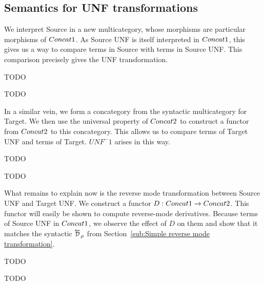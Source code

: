 \subsection{Semantics for UNF transformations} %
\label{sub:Semantics for UNF transformations}

We interpret Source in a new multicategory, 
whose morphisms are particular morphisms of $Concat1$.
As Source UNF is itself interpreted in $Concat1$, 
this gives us a way to compare terms in Source with terms in Source UNF.
This comparison precisely gives the UNF transformation.

\begin{definition}
    TODO
\end{definition}


\begin{proposition}
    TODO
\end{proposition}

In a similar vein, we form a concategory from the syntactic multicategory for Target.
We then use the universal property of $Concat2$ to construct a functor from $Concat2$ to this concategory.
This allows us to compare terms of Target UNF and terms of Target. 
$UNF^-1$ arises in this way.

\begin{definition}
    TODO
\end{definition}

\begin{proposition}
    TODO
\end{proposition}

What remains to explain now is the reverse mode transformation between Source UNF and Target UNF.
We construct a functor $D:Concat1\to Concat2$. 
This functor will easily be shown to compute reverse-mode derivatives.
Because terms of Source UNF in $Concat1$, we observe the effect of $D$ on them
and show that it matches the syntactic $\Dsynrevsymbol_{\rho}$ 
from Section~\ref{sub:Simple reverse mode transformation}.

\begin{definition}
    TODO
\end{definition}

\begin{proposition}
    TODO
\end{proposition}


